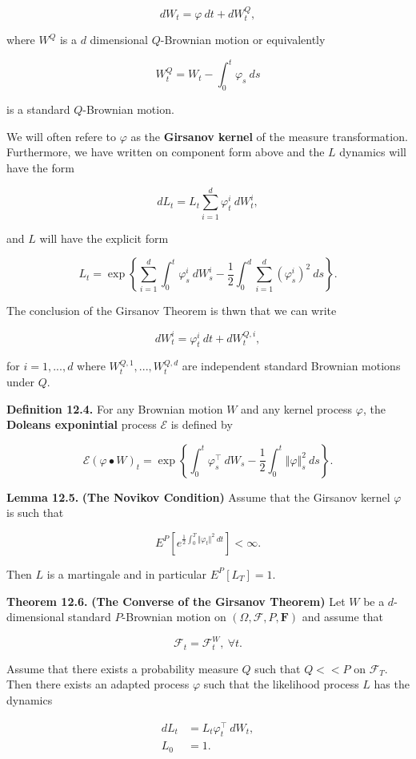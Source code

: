 \documentclass[
]{article}
\begin{document}
\[
dW_t=\varphi\ dt+dW_t^Q,
\]

where \(W^Q\) is a \(d\) dimensional \(Q\)-Brownian motion or
equivalently

\[
W_t^Q=W_t-\int_0^t\varphi_s\ ds
\]

is a standard \(Q\)-Brownian motion.

We will often refere to \(\varphi\) as the \textbf{Girsanov kernel} of
the measure transformation. Furthermore, we have written on component
form above and the \(L\) dynamics will have the form

\[
dL_t=L_t\sum_{i=1}^d\varphi^i_t\ dW_t^i,
\]

and \(L\) will have the explicit form

\[
L_t=\exp\left\{\sum_{i=1}^d\int_0^t\varphi^i_s\ dW_s^i - \frac{1}{2}\int_0^d\sum_{i=1}^d(\varphi^i_s)^2\ ds\right\}.
\]

The conclusion of the Girsanov Theorem is thwn that we can write

\[
dW_t^i=\varphi_t^i\ dt+dW_t^{Q,i},
\]

for \(i=1,...,d\) where \(W_t^{Q,1},...,W_t^{Q,d}\) are independent
standard Brownian motions under \(Q\).

\textbf{Definition 12.4.} For any Brownian motion \(W\) and any kernel
process \(\varphi\), the \textbf{Doleans exponintial} process
\(\mathcal{E}\) is defined by

\[
\mathcal{E}(\varphi\bullet W)_t=\exp\left\{\int_0^t\varphi^\top_s\ dW_s -\frac{1}{2}\int_0^t\Vert \varphi\Vert^2_s\ ds\right\}.
\]

\textbf{Lemma 12.5.} \textbf{(The Novikov Condition)} Assume that the
Girsanov kernel \(\varphi\) is such that

\[
E^P\left[e^{\frac{1}{2}\int_0^T\Vert \varphi_t\Vert^2\ dt}\right]<\infty.
\]

Then \(L\) is a martingale and in particular \(E^P[L_T]=1\).

\textbf{Theorem 12.6.} \textbf{(The Converse of the Girsanov Theorem)}
Let \(W\) be a \(d\)-dimensional standard \(P\)-Brownian motion on
\((\Omega,\mathcal{F},P,\mathbf{F})\) and assume that

\[
\mathcal{F}_t=\mathcal{F}^W_t,\ \forall t.
\]

Assume that there exists a probability measure \(Q\) such that \(Q<<P\)
on \(\mathcal{F}_T\). Then there exists an adapted process \(\varphi\)
such that the likelihood process \(L\) has the dynamics

\begin{align*}
dL_t&=L_t\varphi^\top_t\ dW_t,\\
L_0&=1.
\end{align*}
\end{document}
